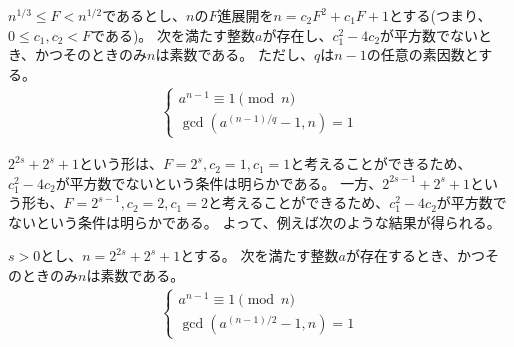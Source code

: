 \begin{Theo}{}{}
$n^{1/3}\le F< n^{1/2}$であるとし、$n$の$F$進展開を$n=c_2F^2+c_1F+1$とする(つまり、$0\le c_1,c_2<F$である)。
次を満たす整数$a$が存在し、$c_1^2-4c_2$が平方数でないとき、かつそのときのみ$n$は素数である。
ただし、$q$は$n-1$の任意の素因数とする。
\begin{align*}
\begin{cases}
a^{n-1} \equiv 1 \pmod{n}\\
\gcd(a^{(n-1)/q}-1, n) = 1
\end{cases}
\end{align*}
\end{Theo}

$2^{2s}+2^s+1$という形は、$F=2^s,c_2=1,c_1=1$と考えることができるため、$c_1^2-4c_2$が平方数でないという条件は明らかである。
一方、$2^{2s-1}+2^s+1$という形も、$F=2^{s-1},c_2=2,c_1=2$と考えることができるため、$c_1^2-4c_2$が平方数でないという条件は明らかである。
よって、例えば次のような結果が得られる。

\begin{Coro}{}{}
$s>0$とし、$n=2^{2s}+2^s+1$とする。
次を満たす整数$a$が存在するとき、かつそのときのみ$n$は素数である。
\begin{align*}
\begin{cases}
a^{n-1} \equiv 1 \pmod{n}\\
\gcd(a^{(n-1)/2}-1, n) = 1
\end{cases}
\end{align*}
\end{Coro}
